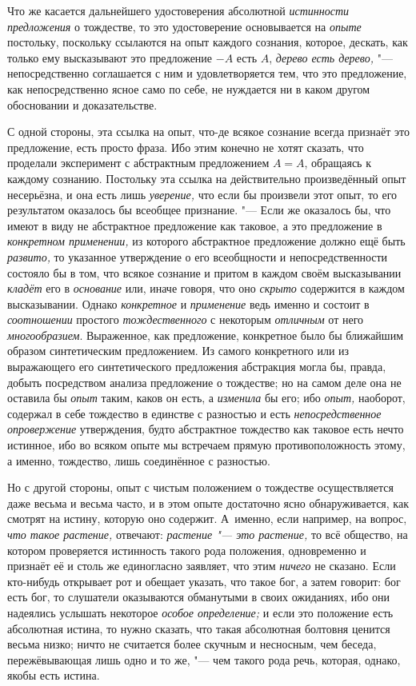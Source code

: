 Что же касается дальнейшего удостоверения абсолютной
{\em истинности предложения} о тождестве, то это
удостоверение основывается на {\em опыте} постольку,
поскольку ссылаются на опыт каждого сознания, которое, дескать, как только
ему высказывают это предложение $-A$ есть $A$,
{\em дерево есть дерево,} "--- непосредственно соглашается
с ним и удовлетворяется тем, что это предложение, как непосредственно ясное
само по себе, не нуждается ни в каком другом обосновании и доказательстве.

С одной стороны, эта ссылка на опыт, что-де всякое сознание всегда признаёт
это предложение, есть просто фраза. Ибо этим конечно не хотят сказать, что
проделали эксперимент с абстрактным предложением $A=A$,
обращаясь к каждому сознанию. Постольку эта ссылка на действительно
произведённый опыт несерьёзна, и она есть лишь
{\em уверение,} что если бы произвели этот опыт, то его
результатом оказалось бы всеобщее признание. "--- Если же оказалось бы, что
имеют в виду не абстрактное предложение как таковое, а это предложение в
{\em конкретном применении,} из которого абстрактное
предложение должно ещё быть {\em развито,} то указанное
утверждение о его всеобщности и непосредственности состояло бы в том, что
всякое сознание и притом в каждом своём высказывании
{\em кладёт} его в {\em основание}
или, иначе говоря, что оно {\em скрыто} содержится в
каждом высказывании. Однако {\em конкретное} и
{\em применение} ведь именно и состоит в
{\em соотношении} простого
{\em тождественного} с некоторым
{\em отличным} от него
{\em многообразием}. Выраженное, как предложение,
конкретное было бы ближайшим образом синтетическим предложением. Из самого
конкретного или из выражающего его синтетического предложения абстракция
могла бы, правда, добыть посредством анализа предложение о тождестве; но на
самом деле она не оставила бы {\em опыт} таким, каков
он есть, а {\em изменила} бы его; ибо
{\em опыт,} наоборот, содержал в себе тождество в
единстве с разностью и есть {\em непосредственное
опровержение} утверждения, будто абстрактное тождество как таковое есть
нечто истинное, ибо во всяком опыте мы встречаем прямую противоположность
этому, а именно, тождество, лишь соединённое с разностью.

Но с другой стороны, опыт с чистым положением о тождестве осуществляется
даже весьма и весьма часто, и в этом опыте достаточно ясно обнаруживается,
как смотрят на истину, которую оно содержит. А~именно, если
например, на вопрос, {\em что такое растение,} отвечают:
{\em растение "--- это растение,} то всё общество,
на котором проверяется истинность такого рода положения, одновременно и
признаёт её и столь же единогласно заявляет, что этим
{\em ничего} не сказано. Если кто-нибудь открывает рот
и обещает указать, что такое бог, а затем говорит: бог есть бог, то
слушатели оказываются обманутыми в своих ожиданиях, ибо они надеялись
услышать некоторое {\em особое определение;} и если
это положение есть абсолютная истина, то нужно сказать, что такая
абсолютная болтовня ценится весьма низко; ничто не считается более скучным
и несносным, чем беседа, пережёвывающая лишь одно и то же, "--- чем такого
рода речь, которая, однако, якобы есть истина.

